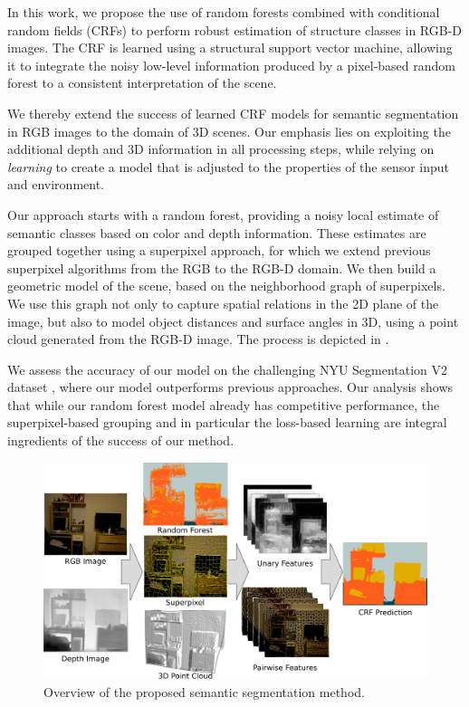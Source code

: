 In this work, we propose the use of random forests combined with conditional
random fields (CRFs) to perform robust estimation of structure classes in RGB-D
images. The CRF is learned using a structural support vector machine,
allowing it to integrate the noisy low-level information produced by a pixel-based
random forest to a consistent interpretation of the scene.

We thereby extend the success of learned CRF models for
semantic segmentation in RGB images to the domain of 3D scenes.
Our emphasis lies on exploiting the additional depth and 3D information in all
processing steps, while relying on \emph{learning} to create a model that 
is adjusted to the properties of the sensor input and environment.

Our approach starts with a random forest, providing a noisy local estimate
of semantic classes based on color and depth information. These estimates
are grouped together using a superpixel approach, for which we extend previous
superpixel algorithms from the RGB to the RGB-D domain.
We then build a geometric model of the scene, based on the neighborhood graph
of superpixels.  We use this graph not only to capture spatial relations in the
2D plane of the image, but also to model object distances and surface angles in
3D, using a point cloud generated from the RGB-D image. The process is depicted
in .

We assess the accuracy of our model on the challenging NYU Segmentation V2
dataset \citep{SilbermanECCV12}, where our model outperforms previous
approaches.  Our analysis shows that while our random forest model
already has competitive performance, the superpixel-based grouping and in
particular the loss-based learning are integral ingredients of the success of our method.

\begin{figure}
    \begin{center}
        \includegraphics[width=\linewidth]{nyu/images/teaser}
    \end{center}
    \caption{%
        Overview of the proposed semantic segmentation method.
    }
\end{figure}


